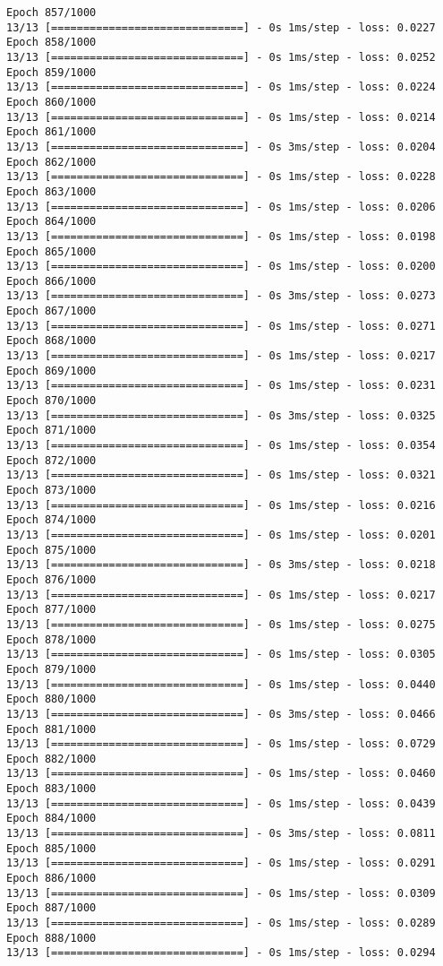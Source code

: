 \documentclass[11pt]{article}
\begin{document}
\begin{Verbatim}[commandchars=\\\{\}]
Epoch 857/1000
13/13 [==============================] - 0s 1ms/step - loss: 0.0227
Epoch 858/1000
13/13 [==============================] - 0s 1ms/step - loss: 0.0252
Epoch 859/1000
13/13 [==============================] - 0s 1ms/step - loss: 0.0224
Epoch 860/1000
13/13 [==============================] - 0s 1ms/step - loss: 0.0214
Epoch 861/1000
13/13 [==============================] - 0s 3ms/step - loss: 0.0204
Epoch 862/1000
13/13 [==============================] - 0s 1ms/step - loss: 0.0228
Epoch 863/1000
13/13 [==============================] - 0s 1ms/step - loss: 0.0206
Epoch 864/1000
13/13 [==============================] - 0s 1ms/step - loss: 0.0198
Epoch 865/1000
13/13 [==============================] - 0s 1ms/step - loss: 0.0200
Epoch 866/1000
13/13 [==============================] - 0s 3ms/step - loss: 0.0273
Epoch 867/1000
13/13 [==============================] - 0s 1ms/step - loss: 0.0271
Epoch 868/1000
13/13 [==============================] - 0s 1ms/step - loss: 0.0217
Epoch 869/1000
13/13 [==============================] - 0s 1ms/step - loss: 0.0231
Epoch 870/1000
13/13 [==============================] - 0s 3ms/step - loss: 0.0325
Epoch 871/1000
13/13 [==============================] - 0s 1ms/step - loss: 0.0354
Epoch 872/1000
13/13 [==============================] - 0s 1ms/step - loss: 0.0321
Epoch 873/1000
13/13 [==============================] - 0s 1ms/step - loss: 0.0216
Epoch 874/1000
13/13 [==============================] - 0s 1ms/step - loss: 0.0201
Epoch 875/1000
13/13 [==============================] - 0s 3ms/step - loss: 0.0218
Epoch 876/1000
13/13 [==============================] - 0s 1ms/step - loss: 0.0217
Epoch 877/1000
13/13 [==============================] - 0s 1ms/step - loss: 0.0275
Epoch 878/1000
13/13 [==============================] - 0s 1ms/step - loss: 0.0305
Epoch 879/1000
13/13 [==============================] - 0s 1ms/step - loss: 0.0440
Epoch 880/1000
13/13 [==============================] - 0s 3ms/step - loss: 0.0466
Epoch 881/1000
13/13 [==============================] - 0s 1ms/step - loss: 0.0729
Epoch 882/1000
13/13 [==============================] - 0s 1ms/step - loss: 0.0460
Epoch 883/1000
13/13 [==============================] - 0s 1ms/step - loss: 0.0439
Epoch 884/1000
13/13 [==============================] - 0s 3ms/step - loss: 0.0811
Epoch 885/1000
13/13 [==============================] - 0s 1ms/step - loss: 0.0291
Epoch 886/1000
13/13 [==============================] - 0s 1ms/step - loss: 0.0309
Epoch 887/1000
13/13 [==============================] - 0s 1ms/step - loss: 0.0289
Epoch 888/1000
13/13 [==============================] - 0s 1ms/step - loss: 0.0294

\end{Verbatim}
\end{document}
